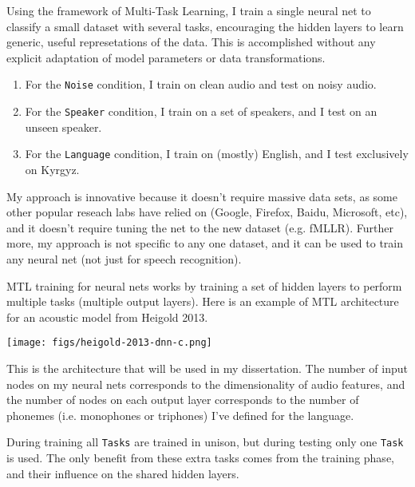 \documentclass[10pt,a4paper]{article}
\begin{document}
Using the framework of Multi-Task Learning, I train a single neural net to classify a small dataset with several tasks, encouraging the hidden layers to learn generic, useful represetations of the data. This is accomplished without any explicit adaptation of model parameters or data transformations.

\begin{enumerate}
  
\item For the \texttt{Noise} condition, I train on clean audio and test on noisy audio.
\item For the \texttt{Speaker} condition, I train on a set of speakers, and I test on an unseen speaker.
\item For the \texttt{Language} condition, I train on (mostly) English, and I test exclusively on Kyrgyz.
\end{enumerate}
    
My approach is innovative because it doesn't require massive data sets, as some other popular reseach labs have relied on (Google, Firefox, Baidu, Microsoft, etc), and it doesn't require tuning the net to the new dataset (e.g. fMLLR). Further more, my approach is not specific to any one dataset, and it can be used to train any neural net (not just for speech recognition).

MTL training for neural nets works by training a set of hidden layers to perform multiple tasks (multiple output layers). Here is an example of MTL architecture for an acoustic model from Heigold 2013.

\begin{center}
\texttt{[image: figs/heigold-2013-dnn-c.png]}
\end{center}

This is the architecture that will be used in my dissertation. The number of input nodes on my neural nets corresponds to the dimensionality of audio features, and the number of nodes on each output layer corresponds to the number of phonemes (i.e. monophones or triphones) I've defined for the language.

During training all \texttt{Tasks} are trained in unison, but during testing only one \texttt{Task} is used. The only benefit from these extra tasks comes from the training phase, and their influence on the shared hidden layers.
\end{document}
